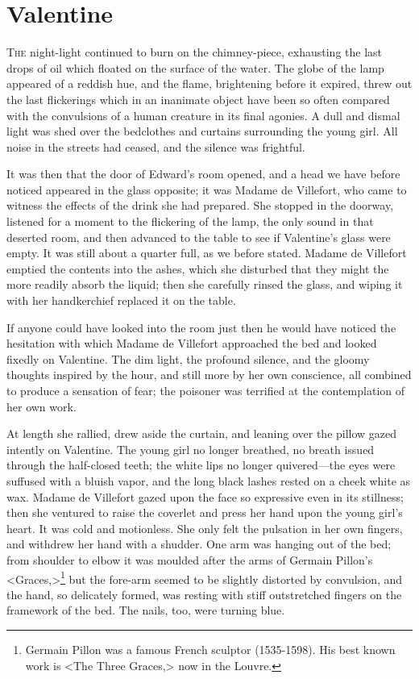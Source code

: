 \chapter{Valentine} 

 \lettrine{T}{he} night-light continued to burn on the chimney-piece, exhausting the last drops of oil which floated on the surface of the water. The globe of the lamp appeared of a reddish hue, and the flame, brightening before it expired, threw out the last flickerings which in an inanimate object have been so often compared with the convulsions of a human creature in its final agonies. A dull and dismal light was shed over the bedclothes and curtains surrounding the young girl. All noise in the streets had ceased, and the silence was frightful. 

 It was then that the door of Edward's room opened, and a head we have before noticed appeared in the glass opposite; it was Madame de Villefort, who came to witness the effects of the drink she had prepared. She stopped in the doorway, listened for a moment to the flickering of the lamp, the only sound in that deserted room, and then advanced to the table to see if Valentine's glass were empty. It was still about a quarter full, as we before stated. Madame de Villefort emptied the contents into the ashes, which she disturbed that they might the more readily absorb the liquid; then she carefully rinsed the glass, and wiping it with her handkerchief replaced it on the table. 

 If anyone could have looked into the room just then he would have noticed the hesitation with which Madame de Villefort approached the bed and looked fixedly on Valentine. The dim light, the profound silence, and the gloomy thoughts inspired by the hour, and still more by her own conscience, all combined to produce a sensation of fear; the poisoner was terrified at the contemplation of her own work. 

 At length she rallied, drew aside the curtain, and leaning over the pillow gazed intently on Valentine. The young girl no longer breathed, no breath issued through the half-closed teeth; the white lips no longer quivered—the eyes were suffused with a bluish vapor, and the long black lashes rested on a cheek white as wax. Madame de Villefort gazed upon the face so expressive even in its stillness; then she ventured to raise the coverlet and press her hand upon the young girl's heart. It was cold and motionless. She only felt the pulsation in her own fingers, and withdrew her hand with a shudder. One arm was hanging out of the bed; from shoulder to elbow it was moulded after the arms of Germain Pillon's <Graces,>\footnote{Germain Pillon was a famous French sculptor (1535-1598). His best known work is <The Three Graces,> now in the Louvre.} but the fore-arm seemed to be slightly distorted by convulsion, and the hand, so delicately formed, was resting with stiff outstretched fingers on the framework of the bed. The nails, too, were turning blue. 

